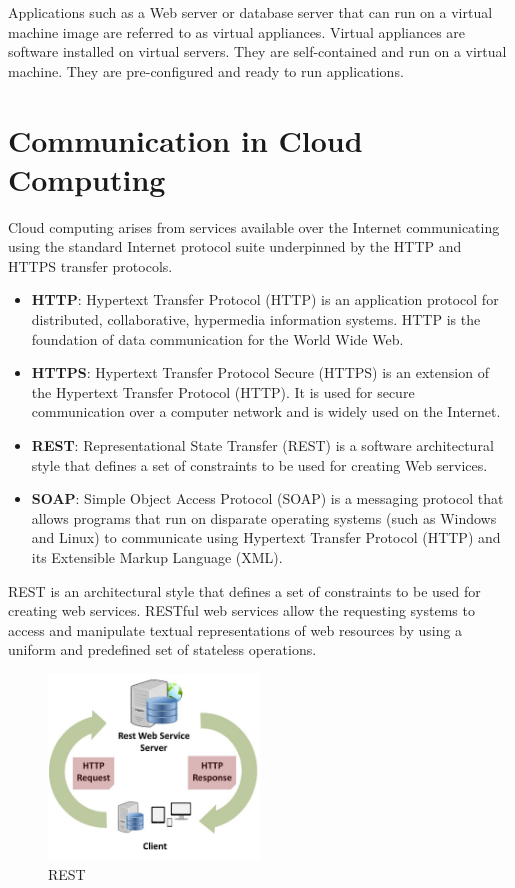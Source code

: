 Applications such as a Web
server or database server that
can run on a virtual machine
image are referred to as virtual
appliances. Virtual appliances are software
installed on virtual servers. They are
self-contained and run on a
virtual machine. They are
pre-configured and ready to run
applications.

\section{Communication in Cloud Computing}

Cloud computing arises from services available over the
Internet communicating using the standard Internet protocol
suite underpinned by the HTTP and HTTPS transfer
protocols.

\begin{itemize}
    \item \textbf{HTTP}: Hypertext Transfer Protocol (HTTP) is an application protocol for distributed, collaborative, hypermedia information systems. HTTP is the foundation of data communication for the World Wide Web.
    \item \textbf{HTTPS}: Hypertext Transfer Protocol Secure (HTTPS) is an extension of the Hypertext Transfer Protocol (HTTP). It is used for secure communication over a computer network and is widely used on the Internet.
    \item \textbf{REST}: Representational State Transfer (REST) is a software architectural style that defines a set of constraints to be used for creating Web services.
    \item \textbf{SOAP}: Simple Object Access Protocol (SOAP) is a messaging protocol that allows programs that run on disparate operating systems (such as Windows and Linux) to communicate using Hypertext Transfer Protocol (HTTP) and its Extensible Markup Language (XML).
\end{itemize}

\begin{observationblock}[REST]
    REST is an architectural style that defines a set of constraints to be used for creating web services. RESTful web services allow the requesting systems to access and manipulate textual representations of web resources by using a uniform and predefined set of stateless operations.
    \begin{figure}[H]
        \centering
        \includegraphics[width=0.5\textwidth]{assets/fig15.png}
        \caption{REST}
        \label{fig:rest}
    \end{figure}
\end{observationblock}

